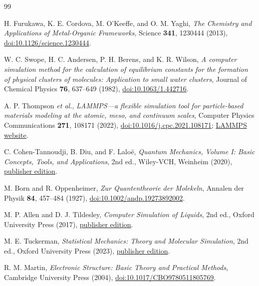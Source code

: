 \documentclass[12pt,a4paper]{article}
\numberwithin{equation}{section}
\begin{document}
\begin{thebibliography}{99}

H. Furukawa, K. E. Cordova, M. O'Keeffe, and O. M. Yaghi,
\emph{The Chemistry and Applications of Metal-Organic Frameworks},
Science \textbf{341}, 1230444 (2013),
\href{https://doi.org/10.1126/science.1230444}{doi:10.1126/science.1230444}.

W. C. Swope, H. C. Andersen, P. H. Berens, and K. R. Wilson,
\emph{A computer simulation method for the calculation of equilibrium
constants for the formation of physical clusters of molecules: Application
to small water clusters}, Journal of Chemical Physics \textbf{76},
637--649 (1982),
\href{https://doi.org/10.1063/1.442716}{doi:10.1063/1.442716}.

A. P. Thompson \emph{et al.},
\emph{LAMMPS---a flexible simulation tool for particle-based materials
modeling at the atomic, meso, and continuum scales}, Computer Physics
Communications \textbf{271}, 108171 (2022),
\href{https://doi.org/10.1016/j.cpc.2021.108171}{doi:10.1016/j.cpc.2021.108171};
\href{https://www.lammps.org/}{LAMMPS website}.

C. Cohen-Tannoudji, B. Diu, and F. Lalo\"e,
\emph{Quantum Mechanics, Volume I: Basic Concepts, Tools, and Applications},
2nd ed., Wiley-VCH, Weinheim (2020),
\href{https://www.wiley.com/en-us/Quantum+Mechanics,+Volume+1:+Basic+Concepts,+Tools,+and+Applications,+2nd+Edition-p-9783527822713}{publisher edition}.

M. Born and R. Oppenheimer,
\emph{Zur Quantentheorie der Molekeln}, Annalen der Physik \textbf{84}, 457--484 (1927),
\href{https://doi.org/10.1002/andp.19273892002}{doi:10.1002/andp.19273892002}.

M. P. Allen and D. J. Tildesley,
\emph{Computer Simulation of Liquids}, 2nd ed.,
Oxford University Press (2017),
\href{https://doi.org/10.1093/oso/9780198803195.001.0001}{publisher edition}.

M. E. Tuckerman,
\emph{Statistical Mechanics: Theory and Molecular Simulation}, 2nd ed.,
Oxford University Press (2023),
\href{https://doi.org/10.1093/oso/9780198825562.001.0001}{publisher edition}.

R. M. Martin,
\emph{Electronic Structure: Basic Theory and Practical Methods}, Cambridge University Press (2004),
\href{https://doi.org/10.1017/CBO9780511805769}{doi:10.1017/CBO9780511805769}.


\end{thebibliography}
\end{document}
